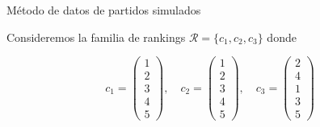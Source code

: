 \documentclass[10pt]{beamer}
\begin{document}
	\begin{frame}{Método de datos de partidos simulados}
		\begin{ejemplo}
			Consideremos la familia de rankings $\mathcal{R} = \{c_1, c_2, c_3\}$ donde
			
			\begin{equation*}
			c_1 = \left( \begin{array}{c}
			1\\
			2\\
			3\\
			4\\
			5
			\end{array} \right), \quad
			c_2 = \left( \begin{array}{c}
			1\\
			2\\
			3\\
			4\\
			5
			\end{array} \right), \quad
			c_3 = \left( \begin{array}{c}
			2\\
			4\\
			1\\
			3\\
			5
			\end{array} \right)
			\end{equation*}
			
		\end{ejemplo}
	\end{frame}
	
\end{document}
